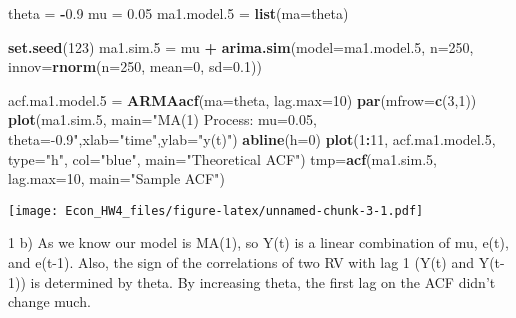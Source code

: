 \documentclass[]{article}
\newenvironment{Shaded}{\begin{snugshade}}{\end{snugshade}}
\newcommand{\KeywordTok}[1]{\textcolor[rgb]{0.13,0.29,0.53}{\textbf{#1}}}
\newcommand{\DataTypeTok}[1]{\textcolor[rgb]{0.13,0.29,0.53}{#1}}
\newcommand{\DecValTok}[1]{\textcolor[rgb]{0.00,0.00,0.81}{#1}}
\newcommand{\FloatTok}[1]{\textcolor[rgb]{0.00,0.00,0.81}{#1}}
\newcommand{\StringTok}[1]{\textcolor[rgb]{0.31,0.60,0.02}{#1}}
\newcommand{\OperatorTok}[1]{\textcolor[rgb]{0.81,0.36,0.00}{\textbf{#1}}}
\newcommand{\NormalTok}[1]{#1}
\begin{document}
\begin{Shaded}
\begin{Highlighting}[]
\NormalTok{theta =}\StringTok{ }\OperatorTok{-}\FloatTok{0.9}
\NormalTok{mu    =}\StringTok{ }\FloatTok{0.05}
\NormalTok{ma1.model.}\DecValTok{5}\NormalTok{ =}\StringTok{ }\KeywordTok{list}\NormalTok{(}\DataTypeTok{ma=}\NormalTok{theta)}

\KeywordTok{set.seed}\NormalTok{(}\DecValTok{123}\NormalTok{)}
\NormalTok{ma1.sim.}\DecValTok{5}\NormalTok{ =}\StringTok{ }\NormalTok{mu }\OperatorTok{+}\StringTok{ }\KeywordTok{arima.sim}\NormalTok{(}\DataTypeTok{model=}\NormalTok{ma1.model.}\DecValTok{5}\NormalTok{, }\DataTypeTok{n=}\DecValTok{250}\NormalTok{,}
                         \DataTypeTok{innov=}\KeywordTok{rnorm}\NormalTok{(}\DataTypeTok{n=}\DecValTok{250}\NormalTok{, }\DataTypeTok{mean=}\DecValTok{0}\NormalTok{, }\DataTypeTok{sd=}\FloatTok{0.1}\NormalTok{))}

\NormalTok{acf.ma1.model.}\DecValTok{5}\NormalTok{ =}\StringTok{ }\KeywordTok{ARMAacf}\NormalTok{(}\DataTypeTok{ma=}\NormalTok{theta, }\DataTypeTok{lag.max=}\DecValTok{10}\NormalTok{)}
\KeywordTok{par}\NormalTok{(}\DataTypeTok{mfrow=}\KeywordTok{c}\NormalTok{(}\DecValTok{3}\NormalTok{,}\DecValTok{1}\NormalTok{))}
    \KeywordTok{plot}\NormalTok{(ma1.sim.}\DecValTok{5}\NormalTok{, }\DataTypeTok{main=}\StringTok{"MA(1) Process: mu=0.05, theta=-0.9"}\NormalTok{,}\DataTypeTok{xlab=}\StringTok{"time"}\NormalTok{,}\DataTypeTok{ylab=}\StringTok{"y(t)"}\NormalTok{)}
    \KeywordTok{abline}\NormalTok{(}\DataTypeTok{h=}\DecValTok{0}\NormalTok{)}
    \KeywordTok{plot}\NormalTok{(}\DecValTok{1}\OperatorTok{:}\DecValTok{11}\NormalTok{, acf.ma1.model.}\DecValTok{5}\NormalTok{, }\DataTypeTok{type=}\StringTok{"h"}\NormalTok{, }\DataTypeTok{col=}\StringTok{"blue"}\NormalTok{, }\DataTypeTok{main=}\StringTok{"Theoretical ACF"}\NormalTok{)}
\NormalTok{    tmp=}\KeywordTok{acf}\NormalTok{(ma1.sim.}\DecValTok{5}\NormalTok{, }\DataTypeTok{lag.max=}\DecValTok{10}\NormalTok{, }\DataTypeTok{main=}\StringTok{"Sample ACF"}\NormalTok{)}
\end{Highlighting}
\end{Shaded}

\texttt{[image: Econ\_HW4\_files/figure-latex/unnamed-chunk-3-1.pdf]}

1 b) As we know our model is MA(1), so Y(t) is a linear combination of
mu, e(t), and e(t-1). Also, the sign of the correlations of two RV with
lag 1 (Y(t) and Y(t-1)) is determined by theta. By increasing theta, the
first lag on the ACF didn't change much.
\end{document}
